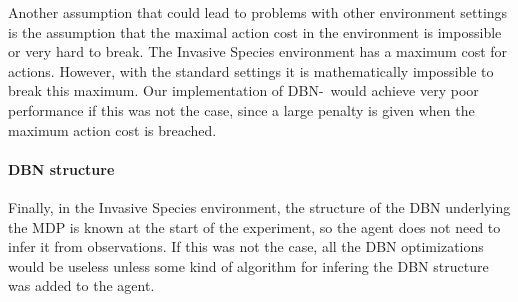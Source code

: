 Another assumption that could lead to problems with other environment settings is the assumption that the maximal action cost in the environment is impossible or very hard to break. The Invasive Species environment has a maximum cost for actions. However, with the standard settings it is mathematically impossible to break this maximum. Our implementation of DBN-\etre\ would achieve very poor performance if this was not the case, since a large penalty is given when the maximum action cost is breached. 

\paragraph{DBN structure} Finally, in the Invasive Species environment, the structure of the DBN underlying the MDP is known at the start of the experiment, so the agent does not need to infer it from observations. If this was not the case, all the DBN optimizations would be useless unless some kind of algorithm for infering the DBN structure was added to the agent. 
